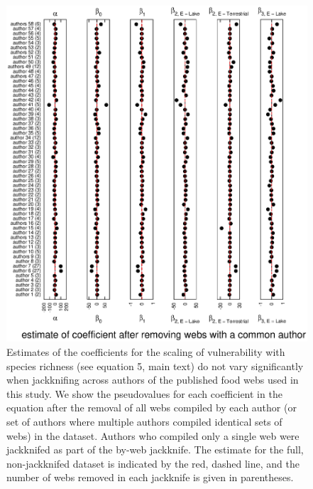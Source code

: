 \documentclass[12pt]{article}
\begin{document}
    \begin{figure}[!h]
    \centerline{\includegraphics*[height=.75\textheight]{Figures/Jackknife/Vul_author.eps}}
    \caption{Estimates of the coefficients for the scaling of vulnerability with species richness
    (see equation 5, main text) do not vary significantly
    when jackknifing across authors of the published food webs used in this study. 
    We show the pseudovalues for each coefficient
    in the equation after the removal of all webs compiled by each author (or set of authors where
    multiple authors compiled identical sets of webs) in the dataset. Authors
    who compiled only a single web were jackknifed as part of the by-web jackknife.
    The estimate for the full, non-jackknifed dataset is indicated by the red, dashed line, and
    the number of webs removed in each jackknife is given in parentheses.}
    \label{Vul_auth}
    \end{figure}


\end{document}
